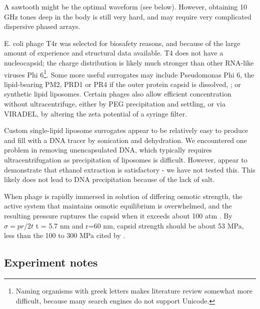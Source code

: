\documentclass[paper.tex]{subfiles}
\begin{document}
\begin{multicols}{1}
A sawtooth might be the optimal waveform (see below). However, obtaining 10 GHz tones deep in the body is still very hard, and may require very complicated dispersive phased arrays\cite{Microwave1982a}.


E. coli phage T4r was selected for biosafety reasons, and because of the large amount of experience\cite{History1995} and structural data available. T4 does not have a nucleocapsid; the charge distribution is likely much stronger than other RNA-like viruses Phi 6\footnote{Naming organisms with greek letters makes literature review somewhat more difficult, because many search engines do not support Unicode.}. Some more useful surrogates may include Pseudomonas Phi 6\cite{Selection2017}, the lipid-bearing PM2, PRD1 or PR4\cite{Lipidcontaining1979} if the outer protein capsid is dissolved\cite{Bacteriophage2002}, \cite{Dissociation1993}; or synthetic lipid liposomes. Certain phages also allow efficient concentration without ultracentrifuge, either by PEG precipitation\cite{Rapid1970} and settling, or via VIRADEL\cite{GROWTH}\cite{Chemical1982}\cite{highly1988}\cite{AdsorptionElution1989}, by altering the zeta potential of a syringe filter. 

Custom single-lipid liposome surrogates appear to be relatively easy to produce and fill with a DNA tracer by sonication and dehydration\cite{Encapsulation1982}\cite{OPTIMIZATION2017}\cite{Liposome2014}. We encountered one problem in removing unencapsulated DNA, which typically requires ultracentrifugation as precipitation of liposomes is difficult. However, \cite{novela} appear to demonstrate that ethanol extraction is satisfactory - we have not tested this. This likely does not lead to DNA precipitation because of the lack of salt. 

When phage is rapidly immersed in solution of differing osmotic strength, the active system that maintains osmotic equilibrium is overwhelmed, and the resulting pressure ruptures the capsid when it exceeds about 100 atm \cite{Osmotic2003}. By $\sigma = pr / 2t $ t = 5.7 nm\cite{Head1988} and r=60 nm, capsid strength should be about 53 MPa, less than the 100 to 300 MPa cited by \cite{Bacteriophage2004}.

\subsection{Experiment notes}


\end{multicols}
\end{document}
